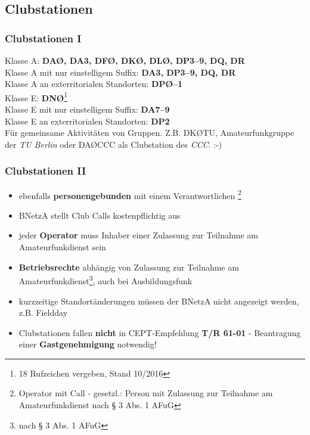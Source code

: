 \subsection{Clubstationen}

\begin{frame}
  \frametitle{Clubstationen I}

  Klasse A: \textbf{DAØ, DA3, DFØ, DKØ, DLØ, DP3--9, DQ, DR} \\
  Klasse A mit nur einstelligem Suffix: \textbf{DA3, DP3--9, DQ, DR} \\
  Klasse A an exterritorialen Standorten: \textbf{DPØ--1} \\[1.5em]
  Klasse E: \textbf{DNØ}\footnote{18 Rufzeichen vergeben, Stand 10/2016} \\
  Klasse E mit nur einstelligem Suffix: \textbf{DA7--9}\\
  Klasse E an exterritorialen Standorten: \textbf{DP2} \\[2em]

  Für gemeinsame Aktivitäten von Gruppen. Z.B. DKØTU, Amateurfunkgruppe der
  \emph{TU Berlin} oder DAØCCC als Clubstation des \emph{CCC}. :-)

\end{frame}

\begin{frame}
  \frametitle{Clubstationen II}

  \begin{itemize}[<+->]
    \item ebenfalls \textbf{personengebunden} mit einem Verantwortlichen
      \footnote{Operator mit Call - gesetzl.: Person mit Zulassung zur
      Teilnahme am Amateurfunkdienst nach § 3 Abs. 1 AFuG}
    \item BNetzA stellt Club Calls kostenpflichtig aus
    \item jeder \textbf{Operator} muss Inhaber einer Zulassung zur Teilnahme am
      Amateurfunkdienst sein
    \item \textbf{Betriebsrechte} abhängig von Zulassung zur Teilnahme am
      Amateurfunkdienst\footnote{nach § 3 Abs. 1 AFuG}, auch bei Ausbildungsfunk
    \item kurzzeitige Standortänderungen müssen der BNetzA nicht angezeigt
      werden, z.B. Fieldday
    \item Clubstationen fallen \textbf{nicht} in CEPT-Empfehlung \textbf{T/R
      61-01} - Beantragung einer \textbf{Gastgenehmigung} notwendig!
  \end{itemize}

\end{frame}

